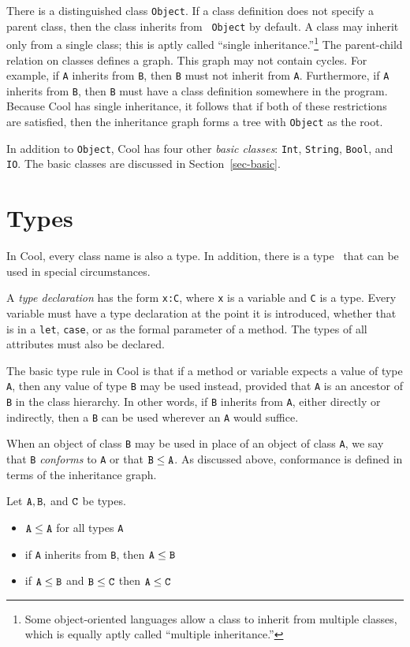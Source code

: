 There is a distinguished class {\tt Object}.  If a class definition
does not specify a parent class, then the class inherits from {\tt
Object} by default.  A class may inherit only from a single class;
this is aptly called ``single inheritance.''\footnote{Some
object-oriented languages allow a class to inherit from multiple
classes, which is equally aptly called ``multiple inheritance.''} The
parent-child relation on classes defines a graph.  This graph may not
contain cycles.  For example, if {\tt A} inherits from {\tt B}, then
{\tt B} must not inherit from {\tt A}.  Furthermore, if {\tt A}
inherits from {\tt B}, then {\tt B} must have a class definition
somewhere in the program.  Because Cool has single inheritance,
it follows that if both of these restrictions are
satisfied, then the inheritance graph forms a tree with {\tt Object}
as the root.

In addition to {\tt Object}, Cool has four other {\em basic classes}: 
	{\tt Int}, {\tt String}, {\tt Bool}, and {\tt IO}.
The basic classes are discussed in Section~\ref{sec-basic}.

\section{Types}

In Cool, every class name is also a type.  In addition, there is a
type \styp\ that can be used in special circumstances.

A {\em type declaration} has the form {\tt x:C}, where {\tt x} is a variable
and {\tt C} is a type.  Every variable must have a type declaration at the
point it is introduced, whether that is in a {\tt let}, {\tt case}, or as
the formal parameter of a method.  The types of all attributes must also be
declared.

The basic type rule in Cool is that if a method or variable expects a value
of type {\tt A}, then any value of type {\tt B} may be used instead, provided
that {\tt A} is an ancestor of {\tt B} in the class hierarchy.  In other
words, if {\tt B} inherits from {\tt A}, either directly or indirectly, then
a {\tt B} can be used wherever an {\tt A} would suffice.  

When an object of class {\tt B} may be used in place of an object of class
{\tt A}, we say that {\tt B} {\em conforms} to {\tt A} or that
$\tt B \leq A$.  As discussed above,
conformance is defined in terms of the inheritance graph.
\begin{definition}[Conformance]
\label{def-conforms}
\rm
Let $\tt A,B,$ and $\tt C$ be types.
\begin{itemize}
\item $\tt A \leq A$ for all types {\tt A}

\item if {\tt A} inherits from {\tt B}, then $\tt A \leq B$

\item if $\tt A \leq B$ and $\tt B \leq C$ then $\tt A \leq C$

\end{itemize}
\end{definition}

